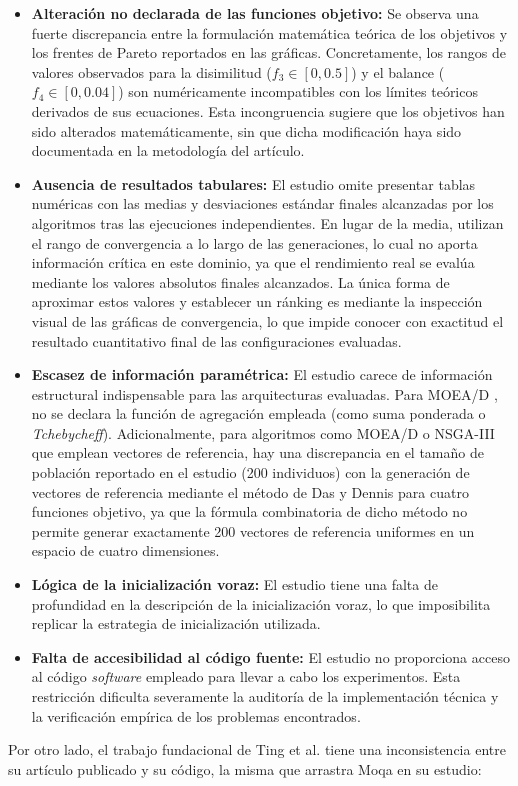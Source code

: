 \begin{itemize}
    \item \textbf{Alteración no declarada de las funciones objetivo:} Se observa una fuerte discrepancia entre la formulación matemática teórica de los objetivos y los frentes de Pareto reportados en las gráficas. Concretamente, los rangos de valores observados para la disimilitud ($f_3 \in [0, 0.5]$) y el balance ($f_4 \in [0, 0.04]$) son numéricamente incompatibles con los límites teóricos derivados de sus ecuaciones. Esta incongruencia sugiere que los objetivos han sido alterados matemáticamente, sin que dicha modificación haya sido documentada en la metodología del artículo.
    \item \textbf{Ausencia de resultados tabulares:} El estudio omite presentar tablas numéricas con las medias y desviaciones estándar finales alcanzadas por los algoritmos tras las ejecuciones independientes. En lugar de la media, utilizan el rango de convergencia a lo largo de las generaciones, lo cual no aporta información crítica en este dominio, ya que el rendimiento real se evalúa mediante los valores absolutos finales alcanzados. La única forma de aproximar estos valores y establecer un ránking es mediante la inspección visual de las gráficas de convergencia, lo que impide conocer con exactitud el resultado cuantitativo final de las configuraciones evaluadas.
    \item \textbf{Escasez de información paramétrica:} El estudio carece de información estructural indispensable para las arquitecturas evaluadas. Para MOEA/D \cite{zhang2007moea}, no se declara la función de agregación empleada (como suma ponderada o \textit{Tchebycheff}). Adicionalmente, para algoritmos como MOEA/D o NSGA-III \cite{deb2013evolutionary} que emplean vectores de referencia, hay una discrepancia en el tamaño de población reportado en el estudio (200 individuos) con la generación de vectores de referencia mediante el método de Das y Dennis \cite{das1998normal} para cuatro funciones objetivo, ya que la fórmula combinatoria de dicho método no permite generar exactamente 200 vectores de referencia uniformes en un espacio de cuatro dimensiones.
    \item \textbf{Lógica de la inicialización voraz:} El estudio tiene una falta de profundidad en la descripción de la inicialización voraz, lo que imposibilita replicar la estrategia de inicialización utilizada.
    \item \textbf{Falta de accesibilidad al código fuente:} El estudio no proporciona acceso al código \textit{software} empleado para llevar a cabo los experimentos. Esta restricción dificulta severamente la auditoría de la implementación técnica y la verificación empírica de los problemas encontrados.
\end{itemize}
Por otro lado, el trabajo fundacional de Ting et al. \cite{ting2010multi} tiene una inconsistencia entre su artículo publicado y su código, la misma que arrastra Moqa en su estudio:

